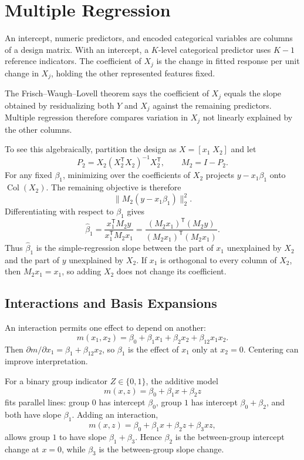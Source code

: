 \documentclass[12pt,oneside]{book}
\numberwithin{equation}{section}
\theoremstyle{definition}
\theoremstyle{plain}
\theoremstyle{remark}
\begin{document}
\section{Multiple Regression}

An intercept, numeric predictors, and encoded categorical variables are
columns of a design matrix. With an intercept, a $K$-level categorical
predictor uses $K-1$ reference indicators. The coefficient of $X_j$ is the
change in fitted response per unit change in $X_j$, holding the other
represented features fixed.

The Frisch--Waugh--Lovell theorem says the coefficient of $X_j$ equals the
slope obtained by residualizing both $Y$ and $X_j$ against the remaining
predictors. Multiple regression therefore compares variation in $X_j$ not
linearly explained by the other columns.

To see this algebraically, partition the design as $X=[x_1\;X_2]$ and let
\[
 P_2=X_2(X_2^\mathsf TX_2)^{-1}X_2^\mathsf T,
 \qquad M_2=I-P_2.
\]
For any fixed $\beta_1$, minimizing over the coefficients of $X_2$ projects
$y-x_1\beta_1$ onto $\operatorname{Col}(X_2)$. The remaining objective is
therefore
\[
 \lVert M_2(y-x_1\beta_1)\rVert_2^2.
\]
Differentiating with respect to $\beta_1$ gives
\begin{equation}
 \widehat\beta_1
 =\frac{x_1^\mathsf TM_2y}{x_1^\mathsf TM_2x_1}
 =\frac{(M_2x_1)^\mathsf T(M_2y)}
        {(M_2x_1)^\mathsf T(M_2x_1)}.
 \label{eq:fwl-residualized-slope}
\end{equation}
Thus $\widehat\beta_1$ is the simple-regression slope between the part of
$x_1$ unexplained by $X_2$ and the part of $y$ unexplained by $X_2$. If
$x_1$ is orthogonal to every column of $X_2$, then $M_2x_1=x_1$, so adding
$X_2$ does not change its coefficient.

\subsection{Interactions and Basis Expansions}

An interaction permits one effect to depend on another:
\[
    m(x_1,x_2)=\beta_0+\beta_1x_1+\beta_2x_2+\beta_{12}x_1x_2.
\]
Then $\partial m/\partial x_1=\beta_1+\beta_{12}x_2$, so $\beta_1$ is the
effect of $x_1$ only at $x_2=0$. Centering can improve interpretation.

For a binary group indicator $Z\in\{0,1\}$, the additive model
\[
 m(x,z)=\beta_0+\beta_1x+\beta_2z
\]
fits parallel lines: group $0$ has intercept $\beta_0$, group $1$ has
intercept $\beta_0+\beta_2$, and both have slope $\beta_1$. Adding an
interaction,
\[
 m(x,z)=\beta_0+\beta_1x+\beta_2z+\beta_3xz,
\]
allows group $1$ to have slope $\beta_1+\beta_3$. Hence $\beta_2$ is the
between-group intercept change at $x=0$, while $\beta_3$ is the
between-group slope change.
\end{document}

